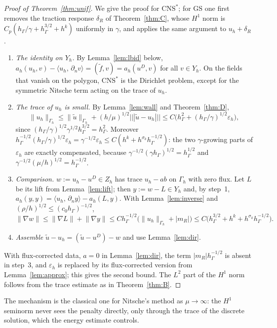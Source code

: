 \documentclass[pdflatex,sn-mathphys-num]{sn-jnl}
\theoremstyle{thmstyleone}
\theoremstyle{thmstylethree}
\newcommand{\hG}{h_\Gamma}
\newcommand{\Gh}{\Gamma_h}
\newcommand{\Zh}{Z_h}
\newcommand{\Yh}{Y_h}
\newcommand{\dn}{\partial_n}
\newcommand{\ut}{\tilde u}
\newcommand{\ft}{\tilde f}
\newcommand{\ip}[2]{\langle #1,\, #2\rangle}
\newcommand{\tnorm}[1]{|\!|\!|#1|\!|\!|}
\newcommand{\norm}[1]{\lVert #1\rVert}
\newcommand{\GS}{\mathrm{GS}}
\newcommand{\CNS}{\mathrm{CNS}^\ast}
\newcommand{\eps}{\varepsilon_h}
\begin{document}
\begin{proof}[Proof of Theorem~\ref{thm:unif}]
We give the proof for $\CNS$; for $\GS$ one first removes the traction response $\delta_R$ of Theorem~\ref{thm:C}, whose $H^1$ norm is $C_p(\hG/\gamma+\hG^{3/2}+h^k)$ uniformly in $\gamma$, and applies the same argument to $u_h+\delta_R$.
\begin{enumerate}
\item \emph{The identity on $\Yh$.} By Lemma~\ref{lem:lbid} below, $a_h(u_h,v)-\ip{u_h}{\dn v}=(\ft,v)=a_h(u^D,v)$ for all $v\in\Yh$. On the fields that vanish on the polygon, $\CNS$ is the Dirichlet problem, except for the symmetric Nitsche term acting on the trace of $u_h$.
\item \emph{The trace of $u_h$ is small.} By Lemma~\ref{lem:wall} and Theorem~\ref{thm:D},
\[
\norm{u_h}_{\Gh}\le\norm{\ut}_{\Gh}+(h/\mu)^{1/2}\tnorm{\ut-u_h}\le C\bigl(\hG^2+(\hG/\gamma)^{1/2}\eps\bigr),
\]
since $(\hG/\gamma)^{1/2}\gamma^{1/2}\hG^{3/2}=\hG^2$. Moreover $\hG^{-1/2}(\hG/\gamma)^{1/2}\eps=\gamma^{-1/2}\eps\le C(h^k+h^{\sigma_k}\hG^{-1/2})$: the two $\gamma$-growing parts of $\eps$ are exactly compensated, because $\gamma^{-1/2}(\gamma\hG)^{1/2}=\hG^{1/2}$ and $\gamma^{-1/2}(\mu/h)^{1/2}=\hG^{-1/2}$.
\item \emph{Comparison.} $w:=u_h-u^D\in\Zh$ has trace $u_h-ab$ on $\Gh$ with zero flux. Let $L$ be its lift from Lemma~\ref{lem:lift}; then $y:=w-L\in\Yh$ and, by step~1, $a_h(y,y)=\ip{u_h}{\dn y}-a_h(L,y)$. With Lemma~\ref{lem:inverse} and $(\rho/h)^{1/2}\le(c_0\hG)^{-1/2}$,
\[
\norm{\nabla w}\le\norm{\nabla L}+\norm{\nabla y}\le C\hG^{-1/2}\bigl(\norm{u_h}_{\Gh}+|m_R|\bigr)\le C\bigl(\hG^{3/2}+h^k+h^{\sigma_k}\hG^{-1/2}\bigr).
\]
\item \emph{Assemble} $\ut-u_h=(\ut-u^D)-w$ and use Lemma~\ref{lem:dir}.
\end{enumerate}
With flux-corrected data, $a=0$ in Lemma~\ref{lem:dir}, the term $|m_R|\hG^{-1/2}$ is absent in step~3, and $\eps$ is replaced by its flux-corrected version from Lemma~\ref{lem:approx}; this gives the second bound. The $L^2$ part of the $H^1$ norm follows from the trace estimate as in Theorem~\ref{thm:B}.
\end{proof}

The mechanism is the classical one for Nitsche's method as $\mu\to\infty$: the $H^1$ seminorm never sees the penalty directly, only through the trace of the discrete solution, which the energy estimate controls.
\end{document}
